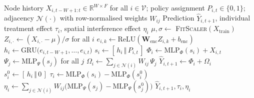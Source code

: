 \begin{algorithm}[t]
\caption{Causal ST-GNN forward pass with direct/spillover decomposition (CG-CEN)}
\label{alg:causal_stgnn}
\begin{algorithmic}[1]
\REQUIRE Node history $X_{i,t-W+1:t} \in \mathbb{R}^{W \times F}$ for all $i \in \mathcal{V}$;
         policy assignment $P_{i,t} \in \{0,1\}$; adjacency $\mathcal{N}(\cdot)$ with
         row-normalised weights $W_{ij}$
\ENSURE  Prediction $\hat{Y}_{i,t+1}$, individual treatment effect $\tau_i$,
         spatial interference effect $\eta_i$
\STATE $\mu, \sigma \gets$ \textsc{FitScaler}$(X_{\text{train}})$ 
\STATE $Z_{i,\cdot} \gets (X_{i,\cdot} - \mu) / \sigma$ for all $i$
    \STATE $e_{i,k} \gets \mathrm{ReLU}(\mathbf{W}_{\text{enc}} Z_{i,k} + b_{\text{enc}})$
\ENDFOR
\STATE $h_i \gets \mathrm{GRU}\big(e_{i,t-W+1}, \dots, e_{i,t}\big)$ 
\STATE $s_i \gets [\,h_i \,\Vert\, P_{i,t}\,]$
\STATE $\Phi_i \gets \mathrm{MLP}_{\Phi}(s_i) + X_{i,t}$ 
\STATE $\Psi_j \gets \mathrm{MLP}_{\Psi}(s_j)$ for all $j$
\STATE $\Omega_i \gets \sum_{j \in \mathcal{N}(i)} W_{ij} \, \Psi_j$ 
\STATE $\hat{Y}_{i,t+1} \gets \Phi_i + \Omega_i$
\STATE $s_i^{0} \gets [\,h_i \,\Vert\, 0\,]$ 
\STATE $\tau_i \gets \mathrm{MLP}_{\Phi}(s_i) - \mathrm{MLP}_{\Phi}(s_i^{0})$ 
\STATE $\eta_i \gets \sum_{j \in \mathcal{N}(i)} W_{ij}\big(\mathrm{MLP}_{\Psi}(s_j)
        - \mathrm{MLP}_{\Psi}(s_j^{0})\big)$ 
\RETURN $\hat{Y}_{i,t+1}, \tau_i, \eta_i$
\end{algorithmic}
\end{algorithm}
